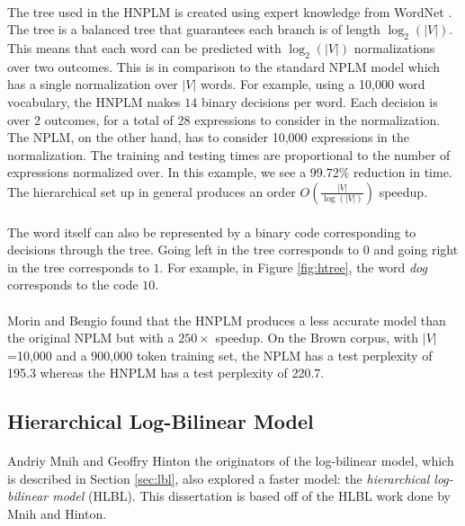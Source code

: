 \paragraph{}
The tree used in the HNPLM is created using expert knowledge from WordNet \cite{MorinBengio2005}. The tree is a balanced tree that guarantees each branch is of length $\log_2(|V|)$. This means that each word can be predicted with $\log_2(|V|)$ normalizations over two outcomes. This is in comparison to the standard NPLM model which has a single normalization over $|V|$ words. For example, using a 10,000 word vocabulary, the HNPLM makes $14$ binary decisions per word. Each decision is over 2 outcomes, for a total of 28 expressions to consider in the normalization. The NPLM, on the other hand, has to consider 10,000 expressions in the normalization. The training and testing times are proportional to the number of expressions normalized over. In this example, we see a 99.72\% reduction in time. The hierarchical set up in general produces an order $O(\frac{|V|}{\log(|V|)})$ speedup.

\paragraph{}
The word itself can also be represented by a binary code corresponding to decisions through the tree. Going left in the tree corresponds to $0$ and going right in the tree corresponds to $1$. For example, in Figure \ref{fig:htree}, the word \emph{dog} corresponds to the code $10$.

\paragraph{}
Morin and Bengio found that the HNPLM produces a less accurate model than the original NPLM but with a $250\times$ speedup. On the Brown corpus, with $|V|$=10,000 and a 900,000 token training set, the NPLM has a test perplexity of 195.3 whereas the HNPLM has a test perplexity of 220.7.

\subsection{Hierarchical Log-Bilinear Model} \label{sec:HLBL}
\paragraph{}
Andriy Mnih and Geoffry Hinton the originators of the log-bilinear model, which is described in Section \ref{sec:lbl},  also explored a faster model: the \emph{hierarchical log-bilinear model} (HLBL). This dissertation is based off of the HLBL work done by Mnih and Hinton. 

